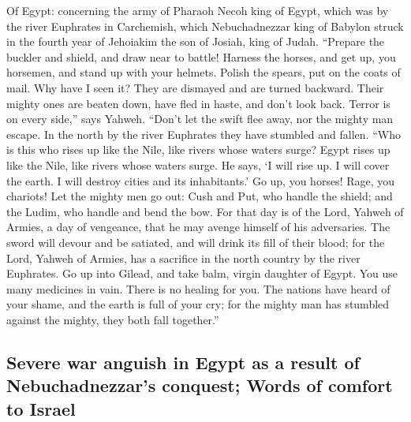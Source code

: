 \begin{paracol}{2}
\begin{otherlanguage}{english}
 Of Egypt: concerning the army of Pharaoh Necoh king of
Egypt, which was by the river Euphrates in Carchemish, which
Nebuchadnezzar king of Babylon struck in the fourth year of Jehoiakim
the son of Josiah, king of Judah.  ``Prepare the buckler
and shield, and draw near to battle!  Harness the horses,
and get up, you horsemen, and stand up with your helmets. Polish the
spears, put on the coats of mail.  Why have I seen it?
They are dismayed and are turned backward. Their mighty ones are beaten
down, have fled in haste, and don't look back. Terror is on every
side,'' says Yahweh.  ``Don't let the swift flee away, nor
the mighty man escape. In the north by the river Euphrates they have
stumbled and fallen.  ``Who is this who rises up like the
Nile, like rivers whose waters surge?  Egypt rises up like
the Nile, like rivers whose waters surge. He says, `I will rise up. I
will cover the earth. I will destroy cities and its inhabitants.'
 Go up, you horses! Rage, you chariots! Let the mighty men
go out: Cush and Put, who handle the shield; and the Ludim, who handle
and bend the bow.  For that day is of the Lord, Yahweh of
Armies, a day of vengeance, that he may avenge himself of his
adversaries. The sword will devour and be satiated, and will drink its
fill of their blood; for the Lord, Yahweh of Armies, has a sacrifice in
the north country by the river Euphrates.  Go up into
Gilead, and take balm, virgin daughter of Egypt. You use many medicines
in vain. There is no healing for you.  The nations have
heard of your shame, and the earth is full of your cry; for the mighty
man has stumbled against the mighty, they both fall together.''

\hypertarget{severe-war-anguish-in-egypt-as-a-result-of-nebuchadnezzars-conquest-words-of-comfort-to-israel}{%
\subsection{Severe war anguish in Egypt as a result of Nebuchadnezzar's
conquest; Words of comfort to
Israel}\label{severe-war-anguish-in-egypt-as-a-result-of-nebuchadnezzars-conquest-words-of-comfort-to-israel}}


\end{otherlanguage}
\end{paracol}
